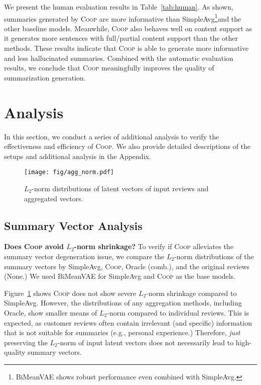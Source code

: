 \documentclass[11pt]{article}
\newcommand{\aggname}{\textsc{Coop}}
\newcommand{\name}{\mbox{\sc BiMeanVAE}}
\newcommand{\simpleavg}{\mbox{SimpleAvg}}
\newcommand{\hl}[1]{#1}
\begin{document}
We present the human evaluation results in Table~\ref{tab:human}. As shown, summaries generated by \aggname{} are more informative than \simpleavg{}\footnote{\name{} shows robust performance even combined with \simpleavg. 
}and the other baseline models. Meanwhile, \aggname{} also behaves well on content support 
as it generates more sentences with full/partial content support than the other methods.
These results indicate that \aggname{} is able to generate more informative and less hallucinated summaries.
Combined with the automatic evaluation results, we conclude that \aggname{} meaningfully improves the quality of summarization generation.

\section{Analysis}\label{sec:exp:analysis}
\hl{In this section, we conduct a series of additional analysis to verify the effectiveness and efficiency of \aggname{}. We also provide detailed descriptions of the setups and additional analysis in the Appendix.}

\begin{figure}[t]
    \centering
    \texttt{[image: fig/agg\_norm.pdf]}
    \caption{\hl{$L_2$-norm} distributions of latent vectors of input reviews and aggregated vectors.} \label{fig:agg_norm}
\end{figure}

\subsection{Summary Vector Analysis}
\label{sub:summary_vec_analysis}
\noindent
{\bf Does \aggname{} avoid $L_2$-norm shrinkage?}
To verify if \aggname{} alleviates the summary vector degeneration issue, we compare the $L_2$-norm distributions of the summary vectors by \simpleavg{}, \aggname{}, Oracle (comb.), and the original reviews (None.) We used \name{} for \simpleavg{} and \aggname{} as the base models.

Figure~\ref{fig:agg_norm} shows \aggname{} does not show severe $L_2$-norm shrinkage compared to \simpleavg{}.
However, the distributions of any aggregation methods, including Oracle, show smaller means of $L_2$-norm compared to individual reviews. This is expected, as customer reviews often contain irrelevant (and specific) information that is not suitable for summaries (e.g., personal experience.)
Therefore, {\em just} preserving the $L_2$-norm of input latent vectors does not necessarily lead to high-quality summary vectors. 
\end{document}
